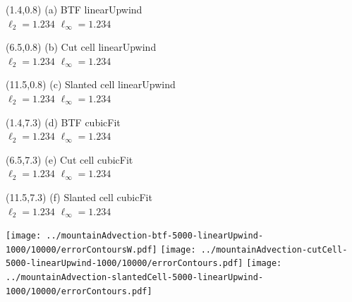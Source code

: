 \documentclass{article}
\begin{document}
\TPMargin{1pt}
\begin{textblock}{4}(1.4,0.8)
\normalsize
(a) BTF linearUpwind \\
\hspace*{1em}$\ell_2 = \num{1.234}$
\hspace*{1em}$\ell_\infty = \num{1.234}$
\end{textblock}
\begin{textblock}{4}(6.5,0.8)
\normalsize
(b) Cut cell linearUpwind \\
\hspace*{1em}$\ell_2 = \num{1.234}$
\hspace*{1em}$\ell_\infty = \num{1.234}$
\end{textblock}
\begin{textblock}{4}(11.5,0.8)
\normalsize
(c) Slanted cell linearUpwind \\
\hspace*{1em}$\ell_2 = \num{1.234}$
\hspace*{1em}$\ell_\infty = \num{1.234}$
\end{textblock}
\begin{textblock}{4}(1.4,7.3)
\normalsize
(d) BTF cubicFit \\
\hspace*{1em}$\ell_2 = \num{1.234}$
\hspace*{1em}$\ell_\infty = \num{1.234}$
\end{textblock}
\begin{textblock}{4}(6.5,7.3)
\normalsize
(e) Cut cell cubicFit \\
\hspace*{1em}$\ell_2 = \num{1.234}$
\hspace*{1em}$\ell_\infty = \num{1.234}$
\end{textblock}
\begin{textblock}{4}(11.5,7.3)
\normalsize
(f) Slanted cell cubicFit \\
\hspace*{1em}$\ell_2 = \num{1.234}$
\hspace*{1em}$\ell_\infty = \num{1.234}$
\end{textblock}
\texttt{[image: ../mountainAdvection-btf-5000-linearUpwind-1000/10000/errorContoursW.pdf]}
\hspace*{0.35em}
\texttt{[image: ../mountainAdvection-cutCell-5000-linearUpwind-1000/10000/errorContours.pdf]}
\hspace*{0.35em}
\texttt{[image: ../mountainAdvection-slantedCell-5000-linearUpwind-1000/10000/errorContours.pdf]} \\
\end{document}
